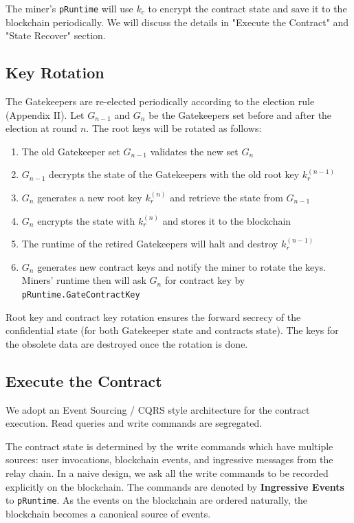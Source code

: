 The miner's \texttt{pRuntime} will use $k_c$ to encrypt the contract state and save it to the blockchain periodically. We will discuss the details in "Execute the Contract" and "State Recover" section.

\subsection{Key Rotation}

The Gatekeepers are re-elected periodically according to the election rule (Appendix II). Let $G_{n-1}$ and $G_n$ be the Gatekeepers set before and after the election at round $n$. The root keys will be rotated as follows:

\begin{enumerate}
    \item The old Gatekeeper set $G_{n-1}$ validates the new set $G_n$
    \item $G_{n-1}$ decrypts the state of the Gatekeepers with the old root key $k_r^{(n-1)}$
    \item $G_n$ generates a new root key $k_r^{(n)}$ and retrieve the state from $G_{n-1}$
    \item $G_n$ encrypts the state with $k_r^{(n)}$ and stores it to the blockchain
    \item The runtime of the retired Gatekeepers will halt and destroy $k_r^{(n-1)}$
    \item $G_n$ generates new contract keys and notify the miner to rotate the keys. Miners' runtime then will ask $G_n$ for contract key by \texttt{pRuntime.GateContractKey}
\end{enumerate}

Root key and contract key rotation ensures the forward secrecy of the confidential state (for both Gatekeeper state and contracts state). The keys for the obsolete data are destroyed once the rotation is done.

\subsection{Execute the Contract}

We adopt an Event Sourcing / CQRS style architecture for the contract execution. Read queries and write commands are segregated.

The contract state is determined by the write commands which have multiple sources: user invocations, blockchain events, and ingressive messages from the relay chain. In a naive design, we ask all the write commands to be recorded explicitly on the blockchain. The commands are denoted by \textbf{Ingressive Events} to \texttt{pRuntime}. As the events on the blockchain are ordered naturally, the blockchain becomes a canonical source of events.

